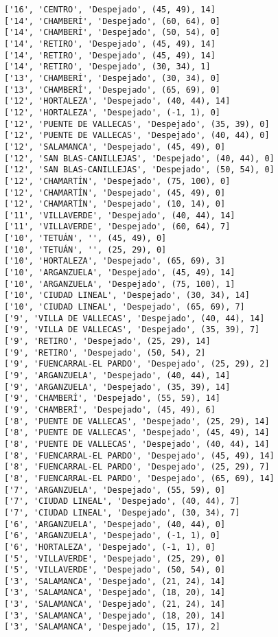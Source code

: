 \documentclass[11pt]{article}
\begin{document}
\begin{Verbatim}[commandchars=\\\{\}]
['16', 'CENTRO', 'Despejado', (45, 49), 14]
['14', 'CHAMBERÍ', 'Despejado', (60, 64), 0]
['14', 'CHAMBERÍ', 'Despejado', (50, 54), 0]
['14', 'RETIRO', 'Despejado', (45, 49), 14]
['14', 'RETIRO', 'Despejado', (45, 49), 14]
['14', 'RETIRO', 'Despejado', (30, 34), 1]
['13', 'CHAMBERÍ', 'Despejado', (30, 34), 0]
['13', 'CHAMBERÍ', 'Despejado', (65, 69), 0]
['12', 'HORTALEZA', 'Despejado', (40, 44), 14]
['12', 'HORTALEZA', 'Despejado', (-1, 1), 0]
['12', 'PUENTE DE VALLECAS', 'Despejado', (35, 39), 0]
['12', 'PUENTE DE VALLECAS', 'Despejado', (40, 44), 0]
['12', 'SALAMANCA', 'Despejado', (45, 49), 0]
['12', 'SAN BLAS-CANILLEJAS', 'Despejado', (40, 44), 0]
['12', 'SAN BLAS-CANILLEJAS', 'Despejado', (50, 54), 0]
['12', 'CHAMARTÍN', 'Despejado', (75, 100), 0]
['12', 'CHAMARTÍN', 'Despejado', (45, 49), 0]
['12', 'CHAMARTÍN', 'Despejado', (10, 14), 0]
['11', 'VILLAVERDE', 'Despejado', (40, 44), 14]
['11', 'VILLAVERDE', 'Despejado', (60, 64), 7]
['10', 'TETUÁN', '', (45, 49), 0]
['10', 'TETUÁN', '', (25, 29), 0]
['10', 'HORTALEZA', 'Despejado', (65, 69), 3]
['10', 'ARGANZUELA', 'Despejado', (45, 49), 14]
['10', 'ARGANZUELA', 'Despejado', (75, 100), 1]
['10', 'CIUDAD LINEAL', 'Despejado', (30, 34), 14]
['10', 'CIUDAD LINEAL', 'Despejado', (65, 69), 7]
['9', 'VILLA DE VALLECAS', 'Despejado', (40, 44), 14]
['9', 'VILLA DE VALLECAS', 'Despejado', (35, 39), 7]
['9', 'RETIRO', 'Despejado', (25, 29), 14]
['9', 'RETIRO', 'Despejado', (50, 54), 2]
['9', 'FUENCARRAL-EL PARDO', 'Despejado', (25, 29), 2]
['9', 'ARGANZUELA', 'Despejado', (40, 44), 14]
['9', 'ARGANZUELA', 'Despejado', (35, 39), 14]
['9', 'CHAMBERÍ', 'Despejado', (55, 59), 14]
['9', 'CHAMBERÍ', 'Despejado', (45, 49), 6]
['8', 'PUENTE DE VALLECAS', 'Despejado', (25, 29), 14]
['8', 'PUENTE DE VALLECAS', 'Despejado', (45, 49), 14]
['8', 'PUENTE DE VALLECAS', 'Despejado', (40, 44), 14]
['8', 'FUENCARRAL-EL PARDO', 'Despejado', (45, 49), 14]
['8', 'FUENCARRAL-EL PARDO', 'Despejado', (25, 29), 7]
['8', 'FUENCARRAL-EL PARDO', 'Despejado', (65, 69), 14]
['7', 'ARGANZUELA', 'Despejado', (55, 59), 0]
['7', 'CIUDAD LINEAL', 'Despejado', (40, 44), 7]
['7', 'CIUDAD LINEAL', 'Despejado', (30, 34), 7]
['6', 'ARGANZUELA', 'Despejado', (40, 44), 0]
['6', 'ARGANZUELA', 'Despejado', (-1, 1), 0]
['6', 'HORTALEZA', 'Despejado', (-1, 1), 0]
['5', 'VILLAVERDE', 'Despejado', (25, 29), 0]
['5', 'VILLAVERDE', 'Despejado', (50, 54), 0]
['3', 'SALAMANCA', 'Despejado', (21, 24), 14]
['3', 'SALAMANCA', 'Despejado', (18, 20), 14]
['3', 'SALAMANCA', 'Despejado', (21, 24), 14]
['3', 'SALAMANCA', 'Despejado', (18, 20), 14]
['3', 'SALAMANCA', 'Despejado', (15, 17), 2]

\end{Verbatim}
\end{document}
